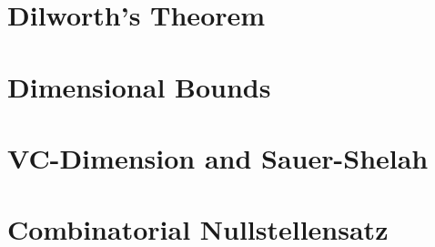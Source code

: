 \documentclass[../../../main.tex]{subfiles}
\begin{document}

\section{Dilworth's Theorem}
\section{Dimensional Bounds}
\section{VC-Dimension and Sauer-Shelah}
\section{Combinatorial Nullstellensatz}

\printbibliography[
    heading=subbibintoc,
    title={References}
]
\end{document}
